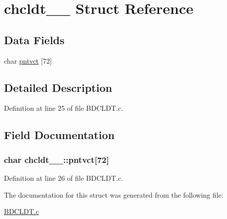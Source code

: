 \hypertarget{structchcldt__1__}{}\section{chcldt\+\_\+\_\+ Struct Reference}
\label{structchcldt__1__}
\subsection*{Data Fields}
\begin{DoxyCompactItemize}
\item 
char \hyperlink{structchcldt__1___a2a7d17c2ca18b67f79d2594168d0bcf4}{pntvct} \mbox{[}72\mbox{]}
\end{DoxyCompactItemize}


\subsection{Detailed Description}


Definition at line 25 of file B\+D\+C\+L\+D\+T.\+c.



\subsection{Field Documentation}
\subsubsection[{\texorpdfstring{pntvct}{pntvct}}]{\setlength{\rightskip}{0pt plus 5cm}char chcldt\+\_\+\_\+\+::pntvct\mbox{[}72\mbox{]}}\hypertarget{structchcldt__1___a2a7d17c2ca18b67f79d2594168d0bcf4}{}\label{structchcldt__1___a2a7d17c2ca18b67f79d2594168d0bcf4}


Definition at line 26 of file B\+D\+C\+L\+D\+T.\+c.



The documentation for this struct was generated from the following file\+:\begin{DoxyCompactItemize}
\item 
\hyperlink{BDCLDT_8c}{B\+D\+C\+L\+D\+T.\+c}\end{DoxyCompactItemize}
